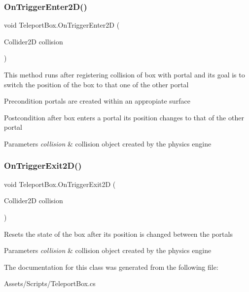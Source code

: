 \subsubsection{\texorpdfstring{On\+Trigger\+Enter2\+D()}{OnTriggerEnter2D()}}
{\footnotesize\ttfamily void Teleport\+Box.\+On\+Trigger\+Enter2D (\begin{DoxyParamCaption}\item[{Collider2D}]{collision }\end{DoxyParamCaption})\hspace{0.3cm}{\ttfamily [inline]}}

This method runs after registering collision of box with portal and its goal is to switch the position of the box to that one of the other portal \begin{DoxyPrecond}{Precondition}
portals are created within an appropiate surface 
\end{DoxyPrecond}
\begin{DoxyPostcond}{Postcondition}
after box enters a portal it\textquotesingle{}s position changes to that of the other portal 
\end{DoxyPostcond}

\begin{DoxyParams}{Parameters}
{\em collision} & collision object created by the physics engine \\
\hline
\end{DoxyParams}
\mbox{\label{class_teleport_box_ae10220f96d834813b63acce959fc009d}} 
\subsubsection{\texorpdfstring{On\+Trigger\+Exit2\+D()}{OnTriggerExit2D()}}
{\footnotesize\ttfamily void Teleport\+Box.\+On\+Trigger\+Exit2D (\begin{DoxyParamCaption}\item[{Collider2D}]{collision }\end{DoxyParamCaption})\hspace{0.3cm}{\ttfamily [inline]}}

Resets the state of the box after its position is changed between the portals 
\begin{DoxyParams}{Parameters}
{\em collision} & collision object created by the physics engine \\
\hline
\end{DoxyParams}


The documentation for this class was generated from the following file\+:\begin{DoxyCompactItemize}
\item 
Assets/\+Scripts/Teleport\+Box.\+cs\end{DoxyCompactItemize}
